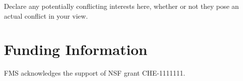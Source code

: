 \documentclass[9pt,comparison]{livecoms}
\begin{document}
Declare any potentially conflicting interests here, whether or not they pose an actual conflict in your view.

\section{Funding Information}
FMS acknowledges the support of NSF grant CHE-1111111.




\end{document}
